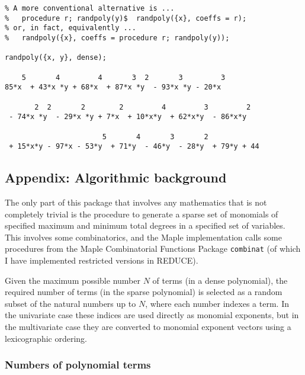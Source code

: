 \begin{verbatim}
% A more conventional alternative is ...
%   procedure r; randpoly(y)$  randpoly({x}, coeffs = r);
% or, in fact, equivalently ...
%   randpoly({x}, coeffs = procedure r; randpoly(y));

randpoly({x, y}, dense);

    5       4         4       3  2       3         3
85*x  + 43*x *y + 68*x  + 87*x *y  - 93*x *y - 20*x

       2  2       2        2         4         3         2
 - 74*x *y  - 29*x *y + 7*x  + 10*x*y  + 62*x*y  - 86*x*y

                       5       4       3       2
 + 15*x*y - 97*x - 53*y  + 71*y  - 46*y  - 28*y  + 79*y + 44
\end{verbatim}




\newtheorem{prop}{Proposition}

\newenvironment{proof}%
   {\par\addvspace\baselineskip\noindent{\bf Proof~}}%
   {\hspace*{\fill}$\Box$\par\addvspace\baselineskip}

\subsection{Appendix: Algorithmic background}

The only part of this package that involves any mathematics that is
not completely trivial is the procedure to generate a sparse set of
monomials of specified maximum and minimum total degrees in a
specified set of variables.  This involves some combinatorics, and the
Maple implementation calls some procedures from the Maple
Combinatorial Functions Package {\tt combinat} (of which I have
implemented restricted versions in REDUCE).

Given the maximum possible number $N$ of terms (in a dense
polynomial), the required number of terms (in the sparse polynomial)
is selected as a random subset of the natural numbers up to $N$, where
each number indexes a term.  In the univariate case these indices are
used directly as monomial exponents, but in the multivariate case they
are converted to monomial exponent vectors using a lexicographic
ordering.


\subsubsection{Numbers of polynomial terms}

